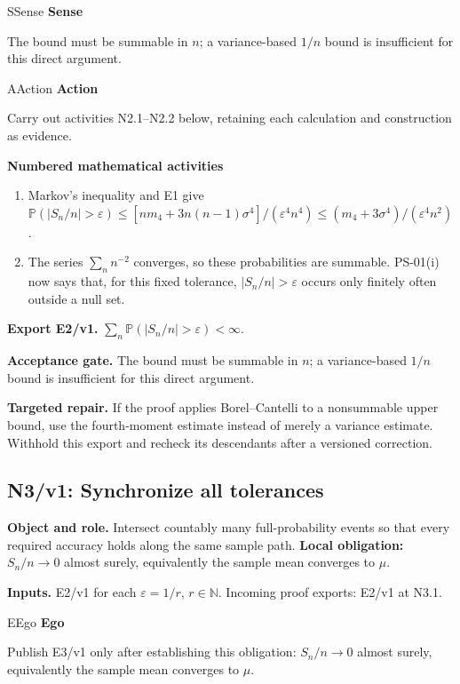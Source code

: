 \documentclass[preprint,12pt,aps,pra,showkeys,amsmath,amssymb,superscriptaddress,floatfix]{revtex4-2}
\theoremstyle{definition}
\theoremstyle{remark}
\newcommand{\mmfaculty}[3]{%
 \begin{mmfacultybox}{#1}{#2}
 {\sffamily\bfseries\color{MMBlue}#2}\par\smallskip #3
 \end{mmfacultybox}}
\newcommand{\field}[2]{\par\smallskip\noindent\textbf{#1.} #2\par}
\begin{document}
\mmfaculty{S}{Sense}{The bound must be summable in \(n\); a variance-based \(1/n\) bound is
insufficient for this direct argument.}

\mmfaculty{A}{Action}{Carry out activities N2.1--N2.2 below, retaining each calculation and
construction as evidence.}

\smallskip\noindent\textbf{Numbered mathematical activities}

\begin{enumerate}[label=N2.\arabic*,leftmargin=3.4em]

\item Markov's inequality and E1 give
\(\mathbb P(|S_n/n|>\varepsilon)\le[n m_4+3n(n-1)\sigma^4]/(\varepsilon^4 n^4)\le(m_4+3\sigma^4)/(\varepsilon^4n^2)\).

\item The series \(\sum_n n^{-2}\) converges, so these probabilities are
summable. PS-01(i) now says that, for this fixed tolerance,
\(|S_n/n|>\varepsilon\) occurs only finitely often outside a null set.

\end{enumerate}

\field{Export E2/v1}{\(\sum_n\mathbb P(|S_n/n|>\varepsilon)<\infty\).}

\field{Acceptance gate}{The bound must be summable in \(n\); a variance-based \(1/n\) bound is
insufficient for this direct argument.}

\field{Targeted repair}{If the proof applies Borel--Cantelli to a nonsummable upper bound, use
the fourth-moment estimate instead of merely a variance estimate.
Withhold this export and recheck its descendants after a versioned
correction.}

\clearpage

\subsection{N3/v1: Synchronize all tolerances}

\field{Object and role}{Intersect countably many full-probability events so that every required
accuracy holds along the same sample path. \textbf{Local obligation:}
\(S_n/n\to0\) almost surely, equivalently the sample mean converges to
\(\mu\).}

\field{Inputs}{E2/v1 for each \(\varepsilon=1/r\), \(r\in\mathbb N\). Incoming proof
exports: E2/v1 at N3.1.}

\mmfaculty{E}{Ego}{Publish E3/v1 only after establishing this obligation: \(S_n/n\to0\)
almost surely, equivalently the sample mean converges to \(\mu\).}
\end{document}
